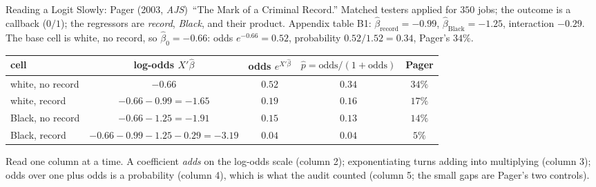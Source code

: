 \documentclass[aspectratio=169,11pt,xcolor=dvipsnames]{beamer}
\newcommand{\core}{\,\raisebox{0.6pt}{\textcolor{corestar}{$\bigstar$}}}
\begin{document}
\begin{frame}{Reading a Logit Slowly: Pager (2003, \emph{AJS})\core}
``The Mark of a Criminal Record.'' Matched testers applied for $350$
jobs; the outcome is a callback ($0/1$); the regressors are
\emph{record}, \emph{Black}, and their product. Appendix table B1:
$\hat\beta_{\text{record}} = -0.99$, $\hat\beta_{\text{Black}} = -1.25$,
interaction $-0.29$. The base cell is white, no record, so
$\hat\beta_0 = -0.66$: odds $e^{-0.66} = 0.52$, probability
$0.52/1.52 = 0.34$, Pager's $34\%$.
\begin{center}\footnotesize
\renewcommand{\arraystretch}{1.05}\setlength{\tabcolsep}{4pt}
\begin{tabular}{lcccc}
\toprule
cell & log-odds $X'\hat\beta$ & odds $e^{X'\hat\beta}$ & $\hat p = \text{odds}/(1+\text{odds})$ & Pager \\
\midrule
white, no record & $-0.66$ & $0.52$ & $0.34$ & $34\%$ \\
white, record & $-0.66 - 0.99 = -1.65$ & $0.19$ & $0.16$ & $17\%$ \\
Black, no record & $-0.66 - 1.25 = -1.91$ & $0.15$ & $0.13$ & $14\%$ \\
Black, record & $-0.66 - 0.99 - 1.25 - 0.29 = -3.19$ & $0.04$ & $0.04$ & $5\%$ \\
\bottomrule
\end{tabular}
\end{center}
\vskip2pt
Read one column at a time. A coefficient \emph{adds} on the log-odds
scale (column 2); exponentiating turns adding into multiplying (column
3); odds over one plus odds is a probability (column 4), which is what the
audit counted (column 5; the small gaps are Pager's two controls).
\end{frame}
\end{document}
